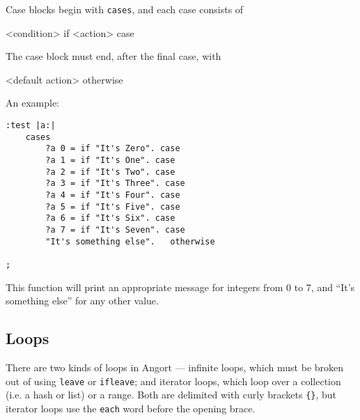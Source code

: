 Case blocks begin with \texttt{cases}, and each case consists
of 
\begin{v}
    <condition> if <action> case
\end{v}
The case block must end, after the final case, with
\begin{v}
    <default action> otherwise
\end{v}
An example:
\begin{lstlisting}
:test |a:|
    cases
        ?a 0 = if "It's Zero". case
        ?a 1 = if "It's One". case
        ?a 2 = if "It's Two". case
        ?a 3 = if "It's Three". case
        ?a 4 = if "It's Four". case
        ?a 5 = if "It's Five". case
        ?a 6 = if "It's Six". case
        ?a 7 = if "It's Seven". case
        "It's something else".   otherwise
    
;
\end{lstlisting}
This function will print an appropriate message for integers from 0 to 7,
and ``It's something else'' for any other value.

\subsection{Loops}
\label{loops}
\def\opencurlybrace{\{}
\def\closecurlybrace{\{}
\indw{\opencurlybrace}
\indw{\closecurlybrace}
There are two kinds of loops in Angort --- infinite loops,
which must be broken out of using \texttt{leave} or \texttt{ifleave}; and
iterator loops, which loop over a collection (i.e. a hash or list) or
a range. Both are delimited with curly brackets \verb+{}+, but iterator loops
use the \texttt{each} word before the opening brace.

